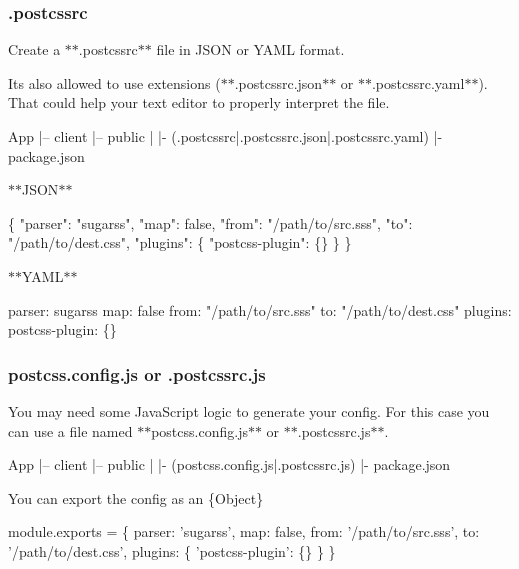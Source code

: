 \subsubsection*{{\ttfamily .postcssrc}}

Create a $\ast$$\ast${\ttfamily .postcssrc}$\ast$$\ast$ file in J\+S\+ON or Y\+A\+ML format.

It\textquotesingle{}s also allowed to use extensions ($\ast$$\ast${\ttfamily .postcssrc.\+json}$\ast$$\ast$ or $\ast$$\ast${\ttfamily .postcssrc.\+yaml}$\ast$$\ast$). That could help your text editor to properly interpret the file.


\begin{DoxyCode}
App
  |– client
  |– public
  |
  |- (.postcssrc|.postcssrc.json|.postcssrc.yaml)
  |- package.json
\end{DoxyCode}


$\ast$$\ast${\ttfamily J\+S\+ON}$\ast$$\ast$ 
\begin{DoxyCode}
\{
  "parser": "sugarss",
  "map": false,
  "from": "/path/to/src.sss",
  "to": "/path/to/dest.css",
  "plugins": \{
    "postcss-plugin": \{\}
  \}
\}
\end{DoxyCode}


$\ast$$\ast${\ttfamily Y\+A\+ML}$\ast$$\ast$ 
\begin{DoxyCode}
parser: sugarss
map: false
from: "/path/to/src.sss"
to: "/path/to/dest.css"
plugins:
  postcss-plugin: \{\}
\end{DoxyCode}


\subsubsection*{{\ttfamily postcss.\+config.\+js} or {\ttfamily .postcssrc.\+js}}

You may need some Java\+Script logic to generate your config. For this case you can use a file named $\ast$$\ast${\ttfamily postcss.\+config.\+js}$\ast$$\ast$ or $\ast$$\ast${\ttfamily .postcssrc.\+js}$\ast$$\ast$.


\begin{DoxyCode}
App
  |– client
  |– public
  |
  |- (postcss.config.js|.postcssrc.js)
  |- package.json
\end{DoxyCode}


You can export the config as an {\ttfamily \{Object\}}


\begin{DoxyCode}
module.exports = \{
  parser: 'sugarss',
  map: false,
  from: '/path/to/src.sss',
  to: '/path/to/dest.css',
  plugins: \{
    'postcss-plugin': \{\}
  \}
\}
\end{DoxyCode}


